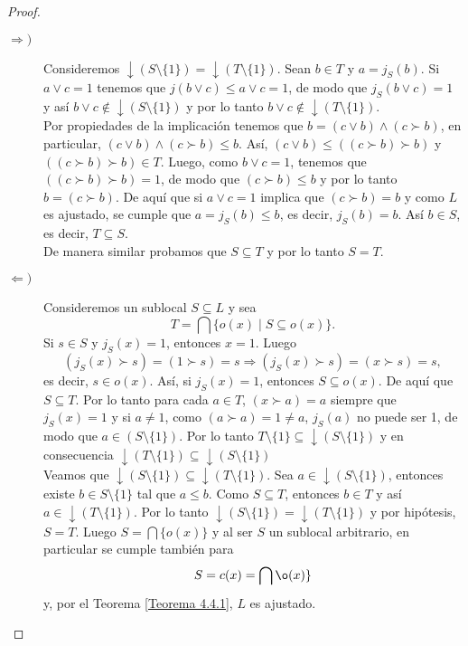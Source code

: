\begin{proof}
\begin{description}
    \item[$\Rightarrow) $] Consideremos $\downarrow(S\setminus \{1\})=\downarrow(T\setminus \{1\})$. Sean $b\in T$ y $a=j_S(b)$. Si $a\vee c=1$ tenemos que $j(b\vee c)\leq a\vee c=1$, de modo que $j_S(b\vee c)=1$ y así $b\vee c\notin \downarrow(S\setminus \{1\})$ y por lo tanto $b\vee c\notin \downarrow (T\setminus \{1\})$.\\

    Por propiedades de la implicación tenemos que $b=(c\vee b)\wedge (c\succ b)$, en particular, $(c\vee b)\wedge (c\succ b)\leq b$. Así, $(c\vee b)\leq ((c\succ b)\succ b)$ y $((c\succ b)\succ b)\in T$. Luego, como $b\vee c=1$, tenemos que $((c\succ b)\succ b)=1$, de modo que $(c\succ b)\leq b$ y por lo tanto $b=(c\succ b)$. De aquí que si $a\vee c=1$ implica que $(c\succ b)=b$ y como $L$ es ajustado, se cumple que $a=j_S(b)\leq b$, es decir, $j_S(b)=b$. Así $b\in S$, es decir, $T\subseteq S$.\\

    De manera similar probamos que $S\subseteq T$ y por lo tanto $S=T$.

    \item[$\Leftarrow) $] Consideremos un sublocal $S\subseteq L$ y sea 
    \[
    T=\bigcap\{o(x)\mid S\subseteq o(x)\}.
    \]
    Si $s\in S$ y $j_S(x)=1$, entonces $x=1$. Luego
    \[
    (j_S(x)\succ s)=(1\succ s)=s\Rightarrow (j_S(x)\succ s)=(x\succ s)=s,
    \]
    es decir, $s\in o(x)$. Así, si $j_S(x)=1$, entonces $S\subseteq o(x)$. De aquí que $S\subseteq T$. Por lo tanto para cada $a\in T$, $(x\succ a)=a$ siempre que $j_S(x)=1$ y si $a\neq 1$, como $(a\succ a)=1\neq a$, $j_S(a)$ no puede ser 1, de modo que $a\in (S\setminus \{1\})$. Por lo tanto $T\setminus\{1\}\subseteq \downarrow (S\setminus \{1\})$ y en consecuencia $\downarrow(T\setminus \{1\})\subseteq \downarrow(S\setminus \{1\})$\\

    Veamos que $\downarrow (S\setminus \{1\})\subseteq \downarrow(T\setminus \{1\})$. Sea $a\in \downarrow(S\setminus \{1\})$, entonces existe $b\in S\setminus \{1\}$ tal que $a\leq b$. Como $S\subseteq T$, entonces $b\in T$ y así $a\in \downarrow(T\setminus \{1\})$. Por lo tanto $\downarrow(S\setminus \{1\})=\downarrow(T\setminus \{1\})$ y por hipótesis, $S=T$. Luego $S=\bigcap \{o(x)\}$ y al ser $S$ un sublocal arbitrario, en particular se cumple también para 
    \[
    S=c(x)=\bigcap\o(x)\}
    \]
    y, por el Teorema \ref{Teorema 4.4.1}, $L$ es ajustado.
\end{description}    
\end{proof}

